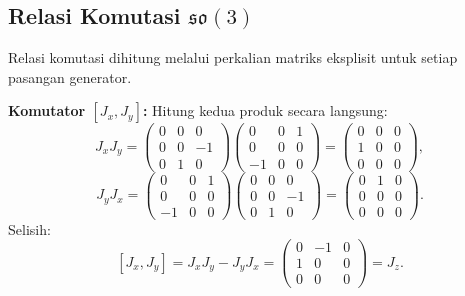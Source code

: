 \subsection{Relasi Komutasi $\mathfrak{so}(3)$}

Relasi komutasi dihitung melalui perkalian matriks eksplisit untuk setiap pasangan generator.

\vspace{0.5em}
\noindent \textbf{Komutator $[J_x, J_y]$:}
Hitung kedua produk secara langsung:
\begin{equation}
    J_x J_y = \begin{pmatrix}0&0&0\\0&0&-1\\0&1&0\end{pmatrix}\!\begin{pmatrix}0&0&1\\0&0&0\\-1&0&0\end{pmatrix}
    = \begin{pmatrix}0&0&0\\1&0&0\\0&0&0\end{pmatrix},
\end{equation}
\begin{equation}
    J_y J_x = \begin{pmatrix}0&0&1\\0&0&0\\-1&0&0\end{pmatrix}\!\begin{pmatrix}0&0&0\\0&0&-1\\0&1&0\end{pmatrix}
    = \begin{pmatrix}0&1&0\\0&0&0\\0&0&0\end{pmatrix}.
\end{equation}
Selisih:
\begin{equation}\label{a1-eq:comm-xy}
    [J_x, J_y] = J_x J_y - J_y J_x
    = \begin{pmatrix}0&-1&0\\1&0&0\\0&0&0\end{pmatrix} = J_z.
\end{equation}

